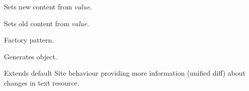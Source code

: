 \documentclass[letterpaper,10pt,english]{sphinxmanual}
\begin{document}
\begin{fulllineitems}
\begin{fulllineitems}
\end{fulllineitems}


\begin{fulllineitems}
\label{index:spy.Site.set_diff}
\end{fulllineitems}


\begin{fulllineitems}
\label{index:spy.Site.set_new_content}
Sets new content from \emph{value}.

\end{fulllineitems}


\begin{fulllineitems}
\label{index:spy.Site.set_old_content}
Sets old content from \emph{value}.

\end{fulllineitems}


\end{fulllineitems}


\begin{fulllineitems}
Factory pattern.

\begin{fulllineitems}
\label{index:spy.SiteFactory.get_site}
Generates  object.

\end{fulllineitems}


\end{fulllineitems}


\begin{fulllineitems}
Extends default Site behaviour providing more information (unified diff)
about changes in text resource.

\begin{fulllineitems}
\label{index:spy.TextSite.compare}
\end{fulllineitems}


\end{fulllineitems}
\end{document}
